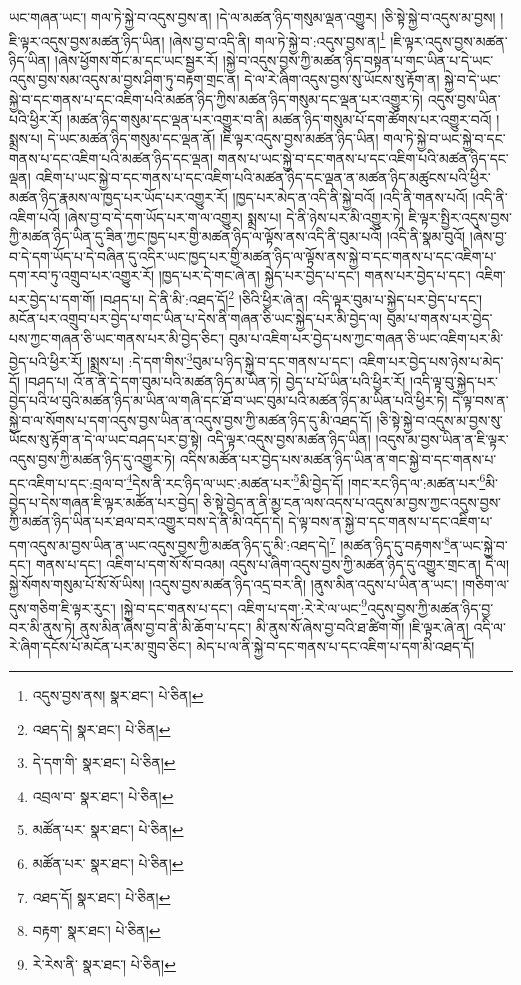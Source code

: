 ཡང་གཞན་ཡང་། གལ་ཏེ་སྐྱེ་བ་འདུས་བྱས་ན། །དེ་ལ་མཚན་ཉིད་གསུམ་ལྡན་འགྱུར། །ཅི་སྟེ་སྐྱེ་བ་འདུས་མ་བྱས། །ཇི་ལྟར་འདུས་བྱས་མཚན་ཉིད་ཡིན། །ཞེས་བྱ་བ་འདི་ནི། གལ་ཏེ་སྐྱེ་བ་:འདུས་བྱས་ན།\footnote{འདུས་བྱས་ནས།  སྣར་ཐང་།  པེ་ཅིན། } །ཇི་ལྟར་འདུས་བྱས་མཚན་ཉིད་ཡིན། །ཞེས་ཕྱོགས་གོང་མ་དང་ཡང་སྦྱར་རོ། །སྐྱེ་བ་འདུས་བྱས་ཀྱི་མཚན་ཉིད་བསྟན་པ་གང་ཡིན་པ་དེ་ཡང་འདུས་བྱས་སམ་འདུས་མ་བྱས་ཤིག་ཏུ་བརྟག་གྲང་ན། དེ་ལ་རེ་ཞིག་འདུས་བྱས་སུ་ཡོངས་སུ་རྟོག་ན། སྐྱེ་བ་དེ་ཡང་སྐྱེ་བ་དང་གནས་པ་དང་འཇིག་པའི་མཚན་ཉིད་ཀྱིས་མཚན་ཉིད་གསུམ་དང་ལྡན་པར་འགྱུར་ཏེ། འདུས་བྱས་ཡིན་པའི་ཕྱིར་རོ། །མཚན་ཉིད་གསུམ་དང་ལྡན་པར་འགྱུར་བ་ནི། མཚན་ཉིད་གསུམ་པོ་དག་ཚོགས་པར་འགྱུར་བའོ། །སྨྲས་པ། དེ་ཡང་མཚན་ཉིད་གསུམ་དང་ལྡན་ནོ། །ཇི་ལྟར་འདུས་བྱས་མཚན་ཉིད་ཡིན། གལ་ཏེ་སྐྱེ་བ་ཡང་སྐྱེ་བ་དང་གནས་པ་དང་འཇིག་པའི་མཚན་ཉིད་དང་ལྡན། གནས་པ་ཡང་སྐྱེ་བ་དང་གནས་པ་དང་འཇིག་པའི་མཚན་ཉིད་དང་ལྡན། འཇིག་པ་ཡང་སྐྱེ་བ་དང་གནས་པ་དང་འཇིག་པའི་མཚན་ཉིད་དང་ལྡན་ན་མཚན་ཉིད་མཚུངས་པའི་ཕྱིར་མཚན་ཉིད་རྣམས་ལ་ཁྱད་པར་ཡོད་པར་འགྱུར་རོ། །ཁྱད་པར་མེད་ན་འདི་ནི་སྐྱེ་བའོ། །འདི་ནི་གནས་པའོ། །འདི་ནི་འཇིག་པའོ། །ཞེས་བྱ་བ་དེ་དག་ཡོད་པར་ག་ལ་འགྱུར། སྨྲས་པ། དེ་ནི་ཉེས་པར་མི་འགྱུར་ཏེ། ཇི་ལྟར་སྤྱིར་འདུས་བྱས་ཀྱི་མཚན་ཉིད་ཡིན་དུ་ཟིན་ཀྱང་ཁྱད་པར་གྱི་མཚན་ཉིད་ལ་ལྟོས་ནས་འདི་ནི་བུམ་པའོ། །འདི་ནི་སྣམ་བུའོ། །ཞེས་བྱ་བ་དེ་དག་ཡོད་པ་དེ་བཞིན་དུ་འདིར་ཡང་ཁྱད་པར་གྱི་མཚན་ཉིད་ལ་ལྟོས་ནས་སྐྱེ་བ་དང་གནས་པ་དང་འཇིག་པ་དག་རབ་ཏུ་འགྲུབ་པར་འགྱུར་རོ། །ཁྱད་པར་དེ་གང་ཞེ་ན། སྐྱེད་པར་བྱེད་པ་དང་། གནས་པར་བྱེད་པ་དང་། འཇིག་པར་བྱེད་པ་དག་གོ། །བཤད་པ། དེ་ནི་མི་:འཐད་དོ།\footnote{འཐད་དེ།  སྣར་ཐང་།  པེ་ཅིན། } །ཅིའི་ཕྱིར་ཞེ་ན། འདི་ལྟར་བུམ་པ་སྐྱེད་པར་བྱེད་པ་དང་། མངོན་པར་འགྲུབ་པར་བྱེད་པ་གང་ཡིན་པ་དེས་ནི་གཞན་ཅི་ཡང་སྐྱེད་པར་མི་བྱེད་ལ། བུམ་པ་གནས་པར་བྱེད་པས་ཀྱང་གཞན་ཅི་ཡང་གནས་པར་མི་བྱེད་ཅིང་། བུམ་པ་འཇིག་པར་བྱེད་པས་ཀྱང་གཞན་ཅི་ཡང་འཇིག་པར་མི་བྱེད་པའི་ཕྱིར་རོ། །སྨྲས་པ། :དེ་དག་གིས་\footnote{དེ་དག་གི་  སྣར་ཐང་།  པེ་ཅིན། }བུམ་པ་ཉིད་སྐྱེ་བ་དང་གནས་པ་དང་། འཇིག་པར་བྱེད་པས་ཉེས་པ་མེད་དོ། །བཤད་པ། འོ་ན་ནི་དེ་དག་བུམ་པའི་མཚན་ཉིད་མ་ཡིན་ཏེ། བྱེད་པ་པོ་ཡིན་པའི་ཕྱིར་རོ། །འདི་ལྟ་བུ་སྐྱེད་པར་བྱེད་པའི་ཕ་བུའི་མཚན་ཉིད་མ་ཡིན་ལ་གཞི་དང་ཐོ་བ་ཡང་བུམ་པའི་མཚན་ཉིད་མ་ཡིན་པའི་ཕྱིར་ཏེ། དེ་ལྟ་བས་ན་སྐྱེ་བ་ལ་སོགས་པ་དག་འདུས་བྱས་ཡིན་ན་འདུས་བྱས་ཀྱི་མཚན་ཉིད་དུ་མི་འཐད་དོ། །ཅི་སྟེ་སྐྱེ་བ་འདུས་མ་བྱས་སུ་ཡོངས་སུ་རྟོག་ན་དེ་ལ་ཡང་བཤད་པར་བྱ་སྟེ། འདི་ལྟར་འདུས་བྱས་མཚན་ཉིད་ཡིན། །འདུས་མ་བྱས་ཡིན་ན་ཇི་ལྟར་འདུས་བྱས་ཀྱི་མཚན་ཉིད་དུ་འགྱུར་ཏེ། འདིས་མཚོན་པར་བྱེད་པས་མཚན་ཉིད་ཡིན་ན་གང་སྐྱེ་བ་དང་གནས་པ་དང་འཇིག་པ་དང་:བྲལ་བ་\footnote{འབྲལ་བ་  སྣར་ཐང་།  པེ་ཅིན། }དེས་ནི་རང་ཉིད་ལ་ཡང་:མཚན་པར་\footnote{མཚོན་པར་  སྣར་ཐང་།  པེ་ཅིན། }མི་བྱེད་དོ། །གང་རང་ཉིད་ལ་:མཚན་པར་\footnote{མཚོན་པར་  སྣར་ཐང་།  པེ་ཅིན། }མི་བྱེད་པ་དེས་གཞན་ཇི་ལྟར་མཚོན་པར་བྱེད། ཅི་སྟེ་བྱེད་ན་ནི་མྱ་ངན་ལས་འདས་པ་འདུས་མ་བྱས་ཀྱང་འདུས་བྱས་ཀྱི་མཚན་ཉིད་ཡིན་པར་ཐལ་བར་འགྱུར་བས་དེ་ནི་མི་འདོད་དེ། དེ་ལྟ་བས་ན་སྐྱེ་བ་དང་གནས་པ་དང་འཇིག་པ་དག་འདུས་མ་བྱས་ཡིན་ན་ཡང་འདུས་བྱས་ཀྱི་མཚན་ཉིད་དུ་མི་:འཐད་དེ།\footnote{འཐད་དོ།  སྣར་ཐང་།  པེ་ཅིན། } །མཚན་ཉིད་དུ་བརྟགས་\footnote{བརྟག་  སྣར་ཐང་།  པེ་ཅིན། }ན་ཡང་སྐྱེ་བ་དང་། གནས་པ་དང་། འཇིག་པ་དག་སོ་སོ་བའམ། འདུས་པ་ཞིག་འདུས་བྱས་ཀྱི་མཚན་ཉིད་དུ་འགྱུར་གྲང་ན། དེ་ལ། སྐྱེ་སོགས་གསུམ་པོ་སོ་སོ་ཡིས། །འདུས་བྱས་མཚན་ཉིད་འདྲ་བར་ནི། །ནུས་མིན་འདུས་པ་ཡིན་ན་ཡང་། །གཅིག་ལ་དུས་གཅིག་ཇི་ལྟར་རུང་། །སྐྱེ་བ་དང་གནས་པ་དང་། འཇིག་པ་དག་:རེ་རེ་ལ་ཡང་\footnote{རེ་རེས་ནི་  སྣར་ཐང་།  པེ་ཅིན། }འདུས་བྱས་ཀྱི་མཚན་ཉིད་བྱ་བར་མི་ནུས་ཏེ། ནུས་མིན་ཞེས་བྱ་བ་ནི་མི་ཆོག་པ་དང་། མི་ནུས་སོ་ཞེས་བྱ་བའི་ཐ་ཚིག་གོ། །ཇི་ལྟར་ཞེ་ན། འདི་ལ་རེ་ཞིག་དངོས་པོ་མངོན་པར་མ་གྲུབ་ཅིང་། མེད་པ་ལ་ནི་སྐྱེ་བ་དང་གནས་པ་དང་འཇིག་པ་དག་མི་འཐད་དོ། 